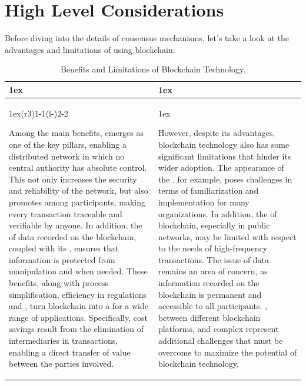 \section{High Level Considerations}

Before diving into the details of consensus mechanisms, let's take a look at the advantages and limitations of using blockchain:

\begin{table}[h]
\begin{tabularx}{\linewidth}{>{\parskip1ex}X@{\kern4\tabcolsep}>{\parskip1ex}X}
\toprule
\hfil\bfseries \color{Orange}{Pros}
&
\hfil\bfseries \color{Orange}{Cons}
\\\cmidrule(r{3\tabcolsep}){1-1}\cmidrule(l{-\tabcolsep}){2-2}

Among the main benefits, \textbf{\color{Blue}{decentralization}} emerges as one of the key pillars, enabling a distributed network in which no central authority has absolute control. This not only increases the security and reliability of the network, but also promotes \textbf{\color{Blue}{transparency and trust}} among participants, making every transaction traceable and verifiable by anyone. In addition, the \textbf{\color{Blue}{immutability}} of data recorded on the blockchain, coupled with its \textbf{\color{Blue}{high availability}}, ensures that information is protected from manipulation and \textbf{\color{Blue}{always accessible}} when needed. These benefits, along with process simplification, efficiency in regulations and \textbf{\color{Blue}{cost savings}}, turn blockchain into a \textbf{\color{Blue}{reliable and programmable platform}} for a wide range of applications. Specifically, cost savings result from the elimination of intermediaries in transactions, enabling a direct transfer of value between the parties involved.
&

However, despite its advantages, blockchain technology also has some significant limitations that hinder its wider adoption. The appearance of the \textbf{\color{Blue}{new technology}}, for example, poses challenges in terms of familiarization and implementation for many organizations. In addition, the \textbf{\color{Blue}{scalability}} of blockchain, especially in public networks, may be limited with respect to the needs of high-frequency transactions. The issue of data \textbf{\color{Blue}{privacy and confidentiality}} remains an area of concern, as information recorded on the blockchain is permanent and accessible to all participants. \textbf{\color{Blue}{Limited adoption}}, \textbf{\color{Blue}{interoperability}} between different blockchain platforms, and complex \textbf{\color{Blue}{regulatory issues}} represent additional challenges that must be overcome to maximize the potential of blockchain technology.
\\\bottomrule
\end{tabularx}
\caption{Benefits and Limitations of Blockchain Technology.}
\end{table}

